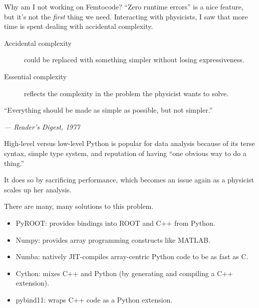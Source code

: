 \documentclass[aspectratio=169]{beamer}
\begin{document}
\begin{frame}{Why am I not working on Femtocode?}
\large
\vspace{0.5 cm}
``Zero runtime errors'' is a nice feature, but it's not the {\it first} thing we need. Interacting with physicists, I saw that more time is spent dealing with accidental complexity.

\vspace{0.5 cm}
\begin{center}
\begin{minipage}{0.9\linewidth}
\begin{description}
\item[Accidental complexity] could be replaced with something simpler without losing expressiveness.

\item[Essential complexity] reflects the complexity in the problem the physicist wants to solve.
\end{description}
\end{minipage}
\end{center}

\vspace{1 cm}
``Everything should be made as simple as possible, but not simpler.''

\hfill \it --- Reader's Digest, 1977
\end{frame}

\begin{frame}{High-level versus low-level}
\vspace{0.5 cm}
Python is popular for data analysis because of its terse syntax, simple type system, and reputation of having ``one obvious way to do a thing.''

\vspace{0.5 cm}
It does so by sacrificing performance, which becomes an issue again as a physicist scales up her analysis.

\vspace{0.5 cm}
There are many, many solutions to this problem.

\begin{itemize}
\item PyROOT: provides bindings into ROOT and C++ from Python.
\item Numpy: provides array programming constructs like MATLAB.
\item Numba: natively JIT-compiles array-centric Python code to be as fast as C.
\item Cython: mixes C++ and Python (by generating and compiling a C++ extension).
\item pybind11: wraps C++ code as a Python extension.
\end{itemize}
\end{frame}
\end{document}
